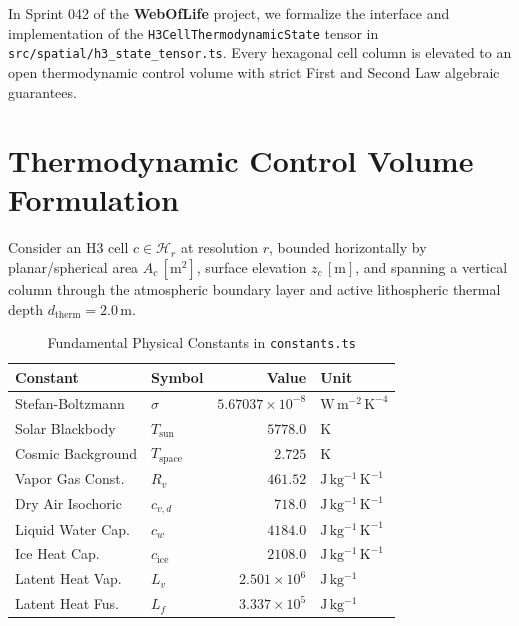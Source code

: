 \documentclass[10pt,twocolumn,a4paper]{article}
\begin{document}
In Sprint 042 of the \textbf{WebOfLife} project, we formalize the interface and implementation of the \texttt{H3CellThermodynamicState} tensor in \texttt{src/spatial/h3\_state\_tensor.ts}. Every hexagonal cell column is elevated to an open thermodynamic control volume with strict First and Second Law algebraic guarantees.

\section{Thermodynamic Control Volume Formulation}

Consider an H3 cell $c \in \mathcal{H}_r$ at resolution $r$, bounded horizontally by planar/spherical area $A_c\,[\mathrm{m}^2]$, surface elevation $z_c\,[\mathrm{m}]$, and spanning a vertical column through the atmospheric boundary layer and active lithospheric thermal depth $d_{\mathrm{therm}} = 2.0\,\mathrm{m}$.

\begin{table}[h]
\centering
\small
\caption{Fundamental Physical Constants in \texttt{constants.ts}}
\begin{tabular}{llrl}
\toprule
Constant & Symbol & Value & Unit \\
\midrule
Stefan-Boltzmann & $\sigma$ & $5.67037 \times 10^{-8}$ & $\mathrm{W\,m^{-2}\,K^{-4}}$ \\
Solar Blackbody & $T_{\mathrm{sun}}$ & $5778.0$ & $\mathrm{K}$ \\
Cosmic Background & $T_{\mathrm{space}}$ & $2.725$ & $\mathrm{K}$ \\
Vapor Gas Const. & $R_v$ & $461.52$ & $\mathrm{J\,kg^{-1}\,K^{-1}}$ \\
Dry Air Isochoric & $c_{v,d}$ & $718.0$ & $\mathrm{J\,kg^{-1}\,K^{-1}}$ \\
Liquid Water Cap. & $c_w$ & $4184.0$ & $\mathrm{J\,kg^{-1}\,K^{-1}}$ \\
Ice Heat Cap. & $c_{\mathrm{ice}}$ & $2108.0$ & $\mathrm{J\,kg^{-1}\,K^{-1}}$ \\
Latent Heat Vap. & $L_v$ & $2.501 \times 10^6$ & $\mathrm{J\,kg^{-1}}$ \\
Latent Heat Fus. & $L_f$ & $3.337 \times 10^5$ & $\mathrm{J\,kg^{-1}}$ \\
\bottomrule
\end{tabular}
\end{table}
\end{document}
